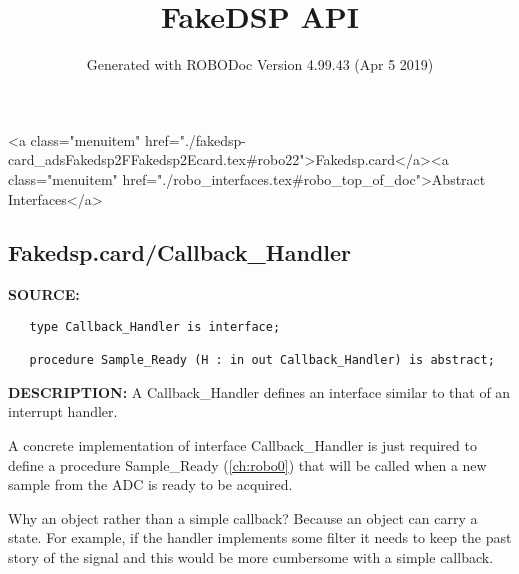 \documentclass{article}
\title{FakeDSP API}
\author{Generated with ROBODoc Version 4.99.43 (Apr  5 2019)
}
\begin{document}
\maketitle
\printindex
\tableofcontents
\newpage

<a class="menuitem" href="./fakedsp-card_adsFakedsp2FFakedsp2Ecard.tex#robo22">Fakedsp.card</a><a class="menuitem" href="./robo_interfaces.tex#robo_top_of_doc">Abstract Interfaces</a>\subsection{Fakedsp.card/Callback\_Handler}
\textbf{SOURCE:}\hspace{0.08in}\begin{verbatim}
   type Callback_Handler is interface;
   
   procedure Sample_Ready (H : in out Callback_Handler) is abstract;
\end{verbatim}
\textbf{DESCRIPTION:}\hspace{0.08in}
   A Callback\_Handler defines an interface similar to that of 
   an interrupt handler.



   A concrete implementation of interface Callback\_Handler is just 
   required to define a procedure Sample\_Ready (\ref{ch:robo0}) that
   will be called when a new sample from the ADC is ready to be 
   acquired.



   Why an object rather than a simple callback?  Because an object
   can carry a state.  For example, if the handler implements some
   filter it needs to keep the past story of the signal and this
   would be more cumbersome with a simple callback. 
\end{document}
